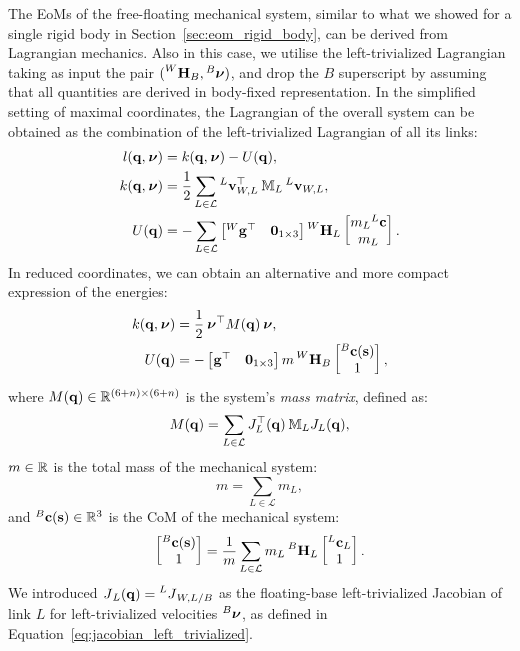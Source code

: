 The \acp{EoM} of the free-floating mechanical system, similar to what we showed for a single rigid body in Section~\ref{sec:eom_rigid_body}, can be derived from Lagrangian mechanics.
Also in this case, we utilise the left-trivialized Lagrangian taking as input the pair $(\homo[W]_B, \Nu[B])$, and drop the $B$ superscript by assuming that all quantities are derived in body-fixed representation.
In the simplified setting of maximal coordinates, the Lagrangian of the overall system can be obtained as the combination of the left-trivialized Lagrangian of all its links:
%
\begin{align*}
    l(\Qu, \Nu) &= k(\Qu, \Nu) - U(\Qu), \\
    k(\Qu, \Nu) &= \frac{1}{2} \sum_{L \in \mathcal{L}} \velsix[L]_{W,L}^\top \masssix_L \velsix[L]_{W,L}, \\
    U(\Qu) &= - \sum_{L \in \mathcal{L}} \begin{bmatrix}\gravity[W]^\top & \zeros_{1\times3}\end{bmatrix}
    \homo[W]_L
    \begin{bmatrix}m_L {}^L\mathbf{c} \\ m_L \end{bmatrix}
    .
\end{align*}
%
In reduced coordinates, we can obtain an alternative and more compact expression of the energies:
%
\begin{align*}
    k(\Qu, \Nu) &= \frac{1}{2} \Nu^\top M(\Qu) \Nu, \\
    U(\Qu) &= -\begin{bmatrix}\gravity^\top & \zeros_{1\times3}\end{bmatrix}
    m \homo[W]_B
    \begin{bmatrix}{}^B\mathbf{c}(\Shape) \\ 1 \end{bmatrix}
    ,
\end{align*}
%
where $M(\Qu) \in \realn^{(6+n)\times(6+n)}$ is the system's \emph{mass matrix}, defined as:
%
\begin{equation}
    \label{eq:mass_matrix}
    M(\Qu) = \sum_{L\in\mathcal{L}} J_L^\top(\Qu) \masssix_L J_L(\Qu),
\end{equation}
%
$m \in \realn$ is the total mass of the mechanical system:
%
\begin{equation*}
    m = \sum_{L\in\mathcal{L}} m_L
    ,
\end{equation*}
%
and ${}^B\mathbf{c}(\Shape) \in \realn^3$ is the \ac{CoM} of the mechanical system:
%
\begin{equation*}
    \begin{bmatrix}{}^B\mathbf{c}(\Shape) \\ 1\end{bmatrix} =
    \frac{1}{m} \sum_{L\in\mathcal{L}} m_L \homo[B]_L \begin{bmatrix}{}^L\mathbf{c}_L\\1\end{bmatrix}
    .
\end{equation*}
%
We introduced $\jac_L(\Qu) = \jac[L]_{W,L/B}$ as the floating-base left-trivialized Jacobian of link $L$ for left-trivialized velocities $\Nu[B]$, as defined in Equation~\eqref{eq:jacobian_left_trivialized}.

